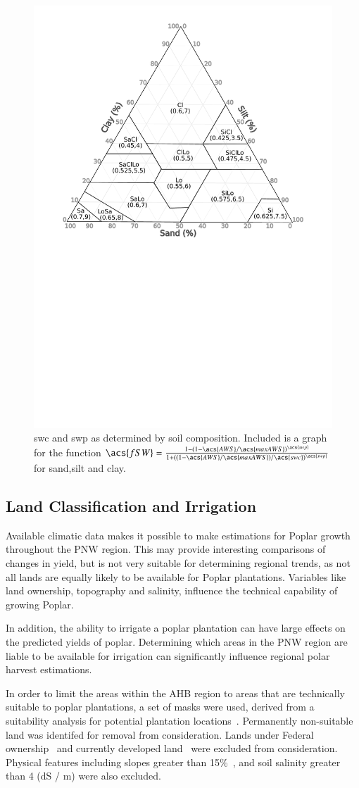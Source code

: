 \documentclass[preprint,12pt]{elsarticle}
\begin{document}
\begin{figure}
  \centering
  \includegraphics[width=0.45\linewidth]{soil_triangle}
  
  \caption{\acs{swc} and \acs{swp} as determined by soil composition.  Included is a graph for the function $\acs{fSW} = \frac{1-(1-\acs{AWS}/\acs{maxAWS})^{\acs{swp}}}{1+((1-\acs{AWS}/\acs{maxAWS})/\acs{swc})^{\acs{swp}}}$ for sand,silt and clay. }
  \label{fig:soil-triangle}
\end{figure}


\subsection{Land Classification and Irrigation}
\label{sec:land}

Available climatic data makes it possible to make estimations for
Poplar growth throughout the \ac{PNW} region.  This may provide
interesting comparisons of changes in yield, but is not very suitable
for determining regional trends, as not all lands are equally likely
to be available for Poplar plantations.  Variables like land
ownership, topography and salinity, influence the technical capability
of growing Poplar.  

In addition, the ability to irrigate a poplar plantation can have
large effects on the predicted yields of poplar.  Determining which
areas in the \ac{PNW} region are liable to be available for irrigation
can significantly influence regional polar harvest estimations.  

In order to limit the areas within the \ac{AHB} region to areas that
are technically suitable to poplar plantations, a set of masks were
used, derived from a suitability analysis for potential plantation
locations~\cite{Cooke2014}. Permanently non-suitable land was
identifed for removal from consideration. Lands under Federal
ownership~\cite{NationalAtlasoftheUnitedStates201} and currently
developed land~\cite{nlcd2011} were excluded from consideration.
Physical features including slopes greater than 15\%~\cite{Gesch2007},
and soil salinity greater than 4 (dS / m) were also excluded.
\end{document}
